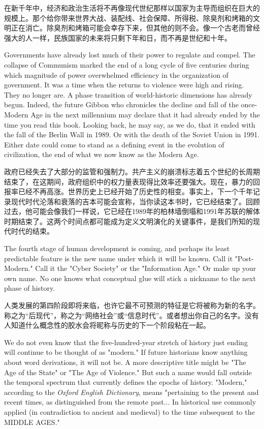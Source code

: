 \begin{Parallel}{97mm}{72mm}
  \ParallelRText
  {在新千年中，经济和政治生活将不再像现代世纪那样以国家为主导而组织在巨大的规模上。那个给你带来世界大战、装配线、社会保障、所得税、除臭剂和烤箱的文明正在消亡。除臭剂和烤箱可能会幸存下来，但其他的则不会。像一个古老而曾经强大的人一样，民族国家的未来将只剩下年和日，而不再是世纪和十年。}

  \ParallelPar

  \ParallelLText
  {Governments have already lost much of their power to regulate and compel. The collapse of Communism marked the end of a long cycle of five centuries during which magnitude of power overwhelmed efficiency in the organization of government. It was a time when the returns to violence were high and rising. They no longer are. A phase transition of world-historic dimensions has already begun. Indeed, the future Gibbon who chronicles the decline and fall of the once-Modern Age in the next millennium may declare that it had already ended by the time you read this book. Looking back, he may say, as we do, that it ended with the fall of the Berlin Wall in 1989. Or with the death of the Soviet Union in 1991. Either date could come to stand as a defining event in the evolution of civilization, the end of what we now know as the Modern Age.}

  \ParallelRText
  {政府已经失去了大部分的监管和强制力。共产主义的崩溃标志着五个世纪的长周期结束了，在这期间，政府组织中的权力量表现得比效率还要强大。现在，暴力的回报率已经不再高涨。世界历史上已经开始了历史性的相变。事实上，下一个千年记录现代时代沦落和衰落的吉本可能会宣称，当你读这本书时，它已经结束了。回顾过去，他可能会像我们一样说，它已经在1989年的柏林墙倒塌和1991年苏联的解体时期结束了。这两个时间点都可能成为定义文明演化的关键事件，是我们所知的现代时代的结束。}

  \ParallelPar

  \ParallelLText
  {The fourth stage of human development is coming, and perhaps its least predictable feature is the new name under which it will be known. Call it "Post-Modern." Call it the "Cyber Society" or the "Information Age." Or make up your own name. No one knows what conceptual glue will stick a nickname to the next phase of history.}
  
  \ParallelRText
  {人类发展的第四阶段即将来临，也许它最不可预测的特征是它将被称为新的名字。称之为“后现代”，称之为“网络社会”或“信息时代”。或者想出你自己的名字。没有人知道什么概念性的胶水会将昵称与历史的下一个阶段粘在一起。}

  \ParallelPar  

  \ParallelLText
  {We do not even know that the five-hundred-year stretch of history just ending will continue to be thought of as "modern." If future historians know anything about word derivations, it will not be. A more descriptive title might be "The Age of the State" or "The Age of Violence." But such a name would fall outside the temporal spectrum that currently defines the epochs of history. "Modern," according to the \emph{Oxford English Dictionary}, means "pertaining to the present and recent times, as distinguished from the remote past... In historical use commonly applied (in contradiction to ancient and medieval) to the time subsequent to the MIDDLE AGES."}
  

\end{Parallel}
